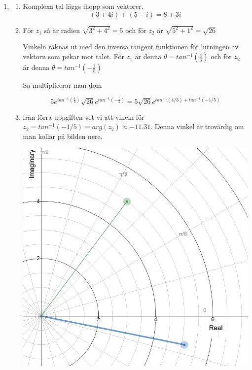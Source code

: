 \documentclass[a4paper,12pt]{article}
\begin{document}
\begin{enumerate}
    \item \begin{enumerate}
              \item Komplexa tal läggs ihopp som vektorer.
                    $$(3+4i)+(5-i)=8+3i$$
              \item För $z_1$ så är radien $\sqrt{3^2+4^2}=5$ och för
                    $z_2$ är $\sqrt{5^2+1^2}=\sqrt{26}$

                    Vinkeln räknas ut med den inversa tangent funktionen
                    för lutningen av vektorn som pekar mot talet.
                    För $z_1$ är denna $\theta = tan^{-1}(\frac{4}{3})$
                    och för $z_2$ är denna $\theta = tan^{-1}(-\frac{1}{5})$

                  Så multiplicerar man dom

                  $$5e^{tan^{-1}(\frac{4}{3})}\sqrt{26}e^{tan^{-1}(-\frac{1}{5})}=5\sqrt{26}e^{tan^{-1}(4/3)+tan^{-1}(-1/5)}$$

                  \item från förra uppgiften vet vi att vineln för $z_2=tan^{-1}(-1/5)=arg(z_2)\approx -11.31$.
                  Denna vinkel är trovärdig om man kollar på bilden nere.
                  
                  \begin{center}
                        \includegraphics[scale=0.5]{Figur 1.png}
                  \end{center}


\end{enumerate}
\end{enumerate}
\end{document}
